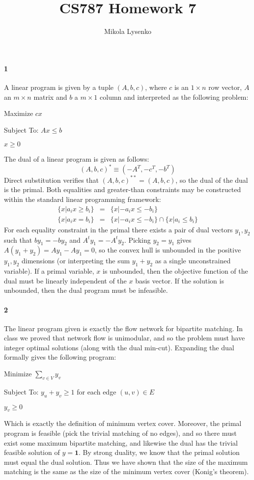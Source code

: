 \documentclass{article}
\title{CS787 Homework 7}
\author{Mikola Lysenko}
\begin{document}
\maketitle{}

\paragraph{1} 
A linear program is given by a tuple $( A, b, c )$, where $c$ is an $1 \times n$ row vector, $A$ an $m \times n$ matrix and $b$ a $m \times 1$ column and interpreted as the following problem:
\begin{center}
Maximize $c x$

Subject To: $A x \leq b$

$x \geq 0$
\end{center}
The dual of a linear program is given as follows:
\[ ( A, b, c)^* \equiv (-A^T, -c^T, -b^T) \]
Direct substitution verifies that $(A,b,c)^{**} = (A,b,c)$, so the dual of the dual is the primal.  Both equalities and greater-than constraints may be constructed within the standard linear programming framework:
\begin{eqnarray*}
\{ x | a_i x \geq b_i \} & = & \{ x | -a_i x \leq -b_i \} \\
\{ x | a_i x = b_i \} & = & \{ x | -a_i x \leq -b_i \} \cap \{ x | a_i \leq b_i \}
\end{eqnarray*}
For each equality constraint in the primal there exists a pair of dual vectors $y_1, y_2$ such that $b y_1 = -b y_2$ and $A^t y_1 = -A^t y_2$.  Picking $y_2 = y_1$ gives $A(y_1 + y_2) = A y_1 - A y_1 = 0$, so the convex hull is unbounded in the positive $y_1, y_2$ dimensions (or interpreting the sum $y_1 + y_2$ as a single unconstrained variable).  If a primal variable, $x$ is unbounded, then the objective function of the dual must be linearly independent of the $x$ basis vector.  If the solution is unbounded, then the dual program must be infeasible.

\paragraph{2}
The linear program given is exactly the flow network for bipartite matching.  In class we proved that network flow is unimodular, and so the problem must have integer optimal solutions (along with the dual min-cut).  Expanding the dual formally gives the following program:
\begin{center}
Minimize $\sum \limits_{v \in V} y_v$

Subject To: $y_u + y_v \geq 1$ for each edge $(u,v) \in E$

$y_v \geq 0$
\end{center}
Which is exactly the definition of minimum vertex cover.  Moreover, the primal program is feasible (pick the trivial matching of no edges), and so there must exist some maximum bipartite matching, and likewise the dual has the trivial feasible solution of $y = \textbf{1}$.  By strong duality, we know that the primal solution must equal the dual solution.  Thus we have shown that the size of the maximum matching is the same as the size of the minimum vertex cover (Konig's theorem).
\end{document}
